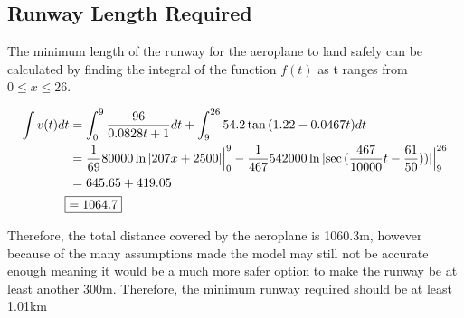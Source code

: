 \subsection{Runway Length Required}
The minimum length of the runway for the aeroplane to land safely can be calculated by finding the integral of the function $f(t)$ as t ranges from $0 \leq x \leq 26$. 

\begin{align*}
    \int v(t) dt &= \int_{0}^{9} \frac{96}{0.0828t + 1} dt + \int_{9}^{26}54.2\tan{(1.22-0.0467t)} dt
    \\
    &= \frac{1}{69} 80000\ln{|207x+2500|}\Big|_0^9 -
    \frac{1}{467}542000\ln{|{\sec{(\frac{467}{10000}t-\frac{61}{50})}})|}\Big|_9^{26}
    \\ &= 645.65 + 419.05
    \\ \Aboxed{&=1064.7}
\end{align*}

Therefore, the total distance covered by the aeroplane is 1060.3m, however because of the many assumptions made the model may still not be accurate enough meaning it would be a much more safer option to make the runway be at least another 300m. Therefore, the minimum runway required should be at least 1.01km